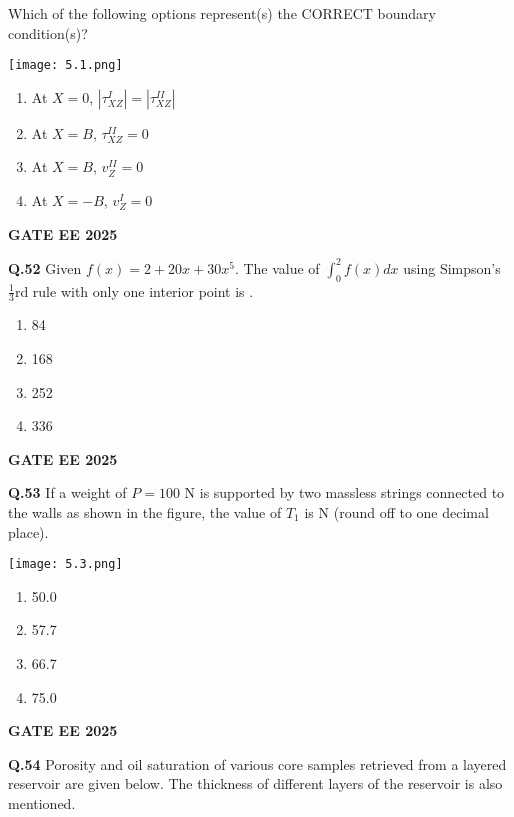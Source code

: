 \documentclass{article}
\begin{document}
Which of the following options represent(s) the CORRECT boundary condition(s)?

\texttt{[image: 5.1.png]}


\begin{enumerate}[label=(\Alph*)]
    \item At $X = 0$, $|\tau_{XZ}^I| = |\tau_{XZ}^{II}|$
    \item At $X = B$, $\tau_{XZ}^{II} = 0$
    \item At $X = B$, $v_Z^{II} = 0$
    \item At $X = -B$, $v_Z^I = 0$
\end{enumerate}
\textbf{GATE EE 2025}

\vspace{0.5cm}

\textbf{Q.52} Given $f(x) = 2 + 20x + 30x^5$. The value of $\int_0^2 f(x) dx$ using Simpson's $\frac{1}{3}$rd rule with only one interior point is \underline{\hspace{1cm}}.
\begin{enumerate}[label=(\Alph*)]
    \item 84
    \item 168
    \item 252
    \item 336
\end{enumerate}
\textbf{GATE EE 2025}

\vspace{0.5cm}

\textbf{Q.53} If a weight of $P = 100$ N is supported by two massless strings connected to the walls as shown in the figure, the value of $T_1$ is \underline{\hspace{1cm}} N (round off to one decimal place).

\texttt{[image: 5.3.png]}

\begin{enumerate}[label=(\Alph*)]
    \item 50.0
    \item 57.7
    \item 66.7
    \item 75.0
\end{enumerate}
\textbf{GATE EE 2025}

\vspace{0.5cm}

\textbf{Q.54} Porosity and oil saturation of various core samples retrieved from a layered reservoir are given below. The thickness of different layers of the reservoir is also mentioned.
\end{document}
